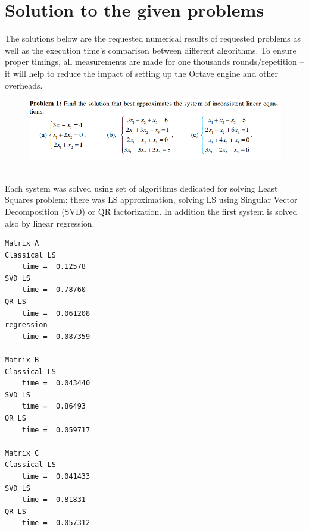 \documentclass[eng,openany]{mgr}
\author{Jaroslaw M. Szumega}
\title{}
\date{21.03.2017}
\begin{document}
\maketitle
\tableofcontents
\chapter{Solution to the given problems}
The solutions below are the requested numerical results of requested problems as well as the execution time's comparison between different algorithms. To ensure proper timings, all measurements are made for one thousands rounds/repetition -- it will help to reduce the impact of setting up the Octave engine and other overheads.
\begin{figure}[h]
	\centering
	\includegraphics[width=0.6\linewidth]{screenshot001}
	\label{fig:screenshot001}
\end{figure}
\\Each system was solved using set of algorithms dedicated for solving Least Squares problem: there was LS approximation, solving LS using Singular Vector Decomposition (SVD) or QR factorization. In addition the first system is solved also by linear regression.
\begin{lstlisting}
Matrix A
Classical LS
	time =  0.12578
SVD LS
	time =  0.78760
QR LS
	time =  0.061208
regression
	time =  0.087359

Matrix B
Classical LS
	time =  0.043440
SVD LS
	time =  0.86493
QR LS
	time =  0.059717

Matrix C
Classical LS
	time =  0.041433
SVD LS
	time =  0.81831
QR LS
	time =  0.057312
\end{lstlisting}
\end{document}
